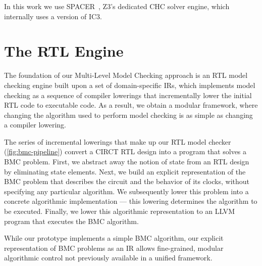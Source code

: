 \documentclass[acmsmall,screen,review]{acmart}
\begin{document}
In this work we use SPACER~\cite{spacer1,spacer2}, Z3's dedicated CHC solver engine, which internally uses a version of IC3.

\section{The \toolname{} RTL Engine}
\label{sec:bmc}
The foundation of our Multi-Level Model Checking approach is an RTL model
checking engine built upon a set of domain-specific IRs, which implements model checking
as a sequence of compiler lowerings that incrementally lower the initial RTL code to
executable code. As a result,
we obtain a modular framework, where changing the algorithm used to
perform model checking is as simple as changing a compiler lowering.

The series of incremental lowerings that make up our RTL model checker
(\autoref{fig:bmc-pipeline}) convert a CIRCT RTL design into a
program that solves a BMC problem.
First, we abstract away the notion of state from an RTL design by eliminating state elements.
Next, we build an explicit representation of the BMC problem that describes the circuit and the behavior of its clocks, without specifying any particular algorithm.
We subsequently lower this problem into a concrete algorithmic implementation
--- this lowering determines the algorithm to be executed.
Finally, we lower this algorithmic representation to an LLVM program that executes the BMC algorithm.

While our prototype implements a simple BMC algorithm, our explicit representation of BMC problems as an IR allows fine-grained, modular algorithmic control not previously available in a unified framework.

\newpage
\end{document}
